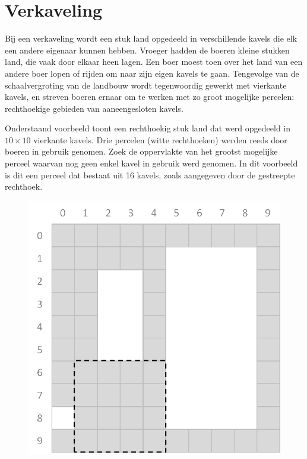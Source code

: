 
\section*{Verkaveling}

Bij een verkaveling wordt een stuk land opgedeeld in verschillende kavels die elk een andere eigenaar kunnen hebben. Vroeger hadden de boeren kleine stukken land, die vaak door elkaar heen lagen. Een boer moest toen over het land van een andere boer lopen of rijden om naar zijn eigen kavels te gaan. Tengevolge van de schaalvergroting van de landbouw wordt tegenwoordig gewerkt met vierkante kavels, en streven boeren ernaar om te werken met zo groot mogelijke percelen: rechthoekige gebieden van aaneengesloten kavels.

Onderstaand voorbeeld toont een rechthoekig stuk land dat werd opgedeeld in $10 \times 10$ vierkante kavels. Drie percelen (witte rechthoeken) werden reeds door boeren in gebruik genomen. Zoek de oppervlakte van het grootst mogelijke perceel waarvan nog geen enkel kavel in gebruik werd genomen. In dit voorbeeld is dit een perceel dat bestaat uit 16 kavels, zoals aangegeven door de gestreepte rechthoek.

\begin{figure}[H]
  \center \includegraphics[scale=0.30]{verkaveling/verkaveling.png}
\end{figure}

